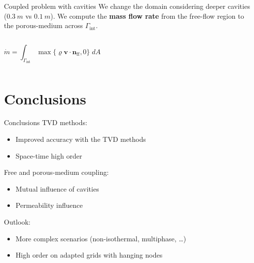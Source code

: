 \documentclass{beamer}
\begin{document}
\begin{frame}{Coupled problem with cavities}
We change the domain considering deeper cavities ($\SI{0.3}{m}$ vs 
$\SI{0.1}{m}$). We compute the \textbf{mass flow rate} from the free-flow 
region to the porous-medium across $\Gamma_\text{int}$.
\vspace{-1cm}
\begin{columns}
\begin{equation*}
\dot{m} = \int_{\Gamma_\text{int}} \max \{ \varrho \mathbf{v} \cdot 
\mathbf{n}_\text{ff} , 0 \} \; dA
\end{equation*}
\begin{figure}
	\centering
	
\end{figure}
\end{columns}
\end{frame}
\section{Conclusions}
\begin{frame}{Conclusions}
TVD methods:
\begin{itemize}
	\item Improved accuracy with the TVD methods
	\item Space-time high order
\end{itemize}
Free and porous-medium coupling:
\begin{itemize}
	\item Mutual influence of cavities
	\item Permeability influence
\end{itemize}
Outlook:
\begin{itemize}
	\item More complex scenarios (non-isothermal, multiphase, \dots)
	\item High order on adapted grids with hanging nodes
\end{itemize}
\end{frame}
\end{document}
